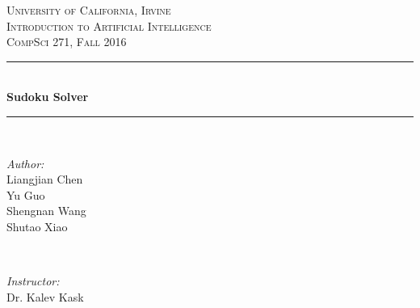 \begin{titlepage}

\newcommand{\HRule}{\rule{\linewidth}{0.5mm}} %

\center %
 

\textsc{\LARGE University of California, Irvine}\\[1.5cm] %
\textsc{\Large Introduction to Artificial Intelligence}\\[0.5cm] %
\textsc{\large CompSci 271, Fall 2016}\\[0.5cm] %


\HRule \\[0.4cm]
{ \huge \bfseries Sudoku Solver}\\[0.4cm] %
\HRule \\[1.5cm]
 

\begin{minipage}{0.4\textwidth}
\begin{flushleft} \large
\emph{Author:}\\
Liangjian Chen \\%
Yu Guo \\
Shengnan Wang \\
Shutao Xiao
\end{flushleft}
\end{minipage}
~
\begin{minipage}{0.4\textwidth}
\begin{flushright} \large
\emph{Instructor:} \\
Dr. Kalev Kask %
\end{flushright}
\end{minipage}\\[2cm]


\end{titlepage}
